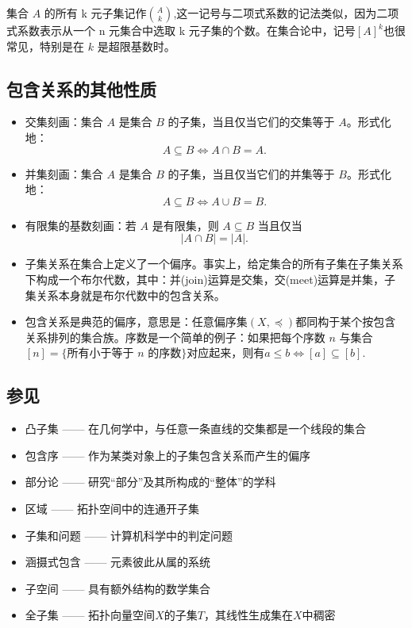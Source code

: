 集合 $A$ 的所有 k 元子集记作$\binom{A}{k}$,这一记号与二项式系数的记法类似，因为二项式系数表示从一个 n 元集合中选取 k 元子集的个数。在集合论中，记号$[A]^k$也很常见，特别是在 $k$ 是超限基数时。
\subsection{包含关系的其他性质}
\begin{itemize}
\item 交集刻画：集合 $A$ 是集合 $B$ 的子集，当且仅当它们的交集等于 $A$。形式化地：
$$
A \subseteq B \iff A \cap B = A.~
$$
\item 并集刻画：集合 $A$ 是集合 $B$ 的子集，当且仅当它们的并集等于 $B$。形式化地：
$$
A \subseteq B \iff A \cup B = B.~
$$
\item 有限集的基数刻画：若 $A$ 是有限集，则 $A \subseteq B$ 当且仅当
$$
|A \cap B| = |A|.~
$$
\item 子集关系在集合上定义了一个偏序。事实上，给定集合的所有子集在子集关系下构成一个布尔代数，其中：并(join)运算是交集，交(meet)运算是并集，子集关系本身就是布尔代数中的包含关系。
\item 包含关系是典范的偏序，意思是：任意偏序集$(X, \preceq)$都同构于某个按包含关系排列的集合族。序数是一个简单的例子：如果把每个序数 $n$ 与集合$[n] = \{ \text{所有小于等于 } n \text{ 的序数} \}$对应起来，则有$a \leq b \iff [a] \subseteq [b]$.
\end{itemize}
\subsection{参见}
\begin{itemize}
\item 凸子集 —— 在几何学中，与任意一条直线的交集都是一个线段的集合
\item 包含序 —— 作为某类对象上的子集包含关系而产生的偏序
\item 部分论 —— 研究“部分”及其所构成的“整体”的学科
\item 区域 —— 拓扑空间中的连通开子集
\item 子集和问题 —— 计算机科学中的判定问题
\item 涵摄式包含 —— 元素彼此从属的系统
\item 子空间 —— 具有额外结构的数学集合
\item 全子集 —— 拓扑向量空间$X$的子集$T$，其线性生成集在$X$中稠密
\end{itemize}
